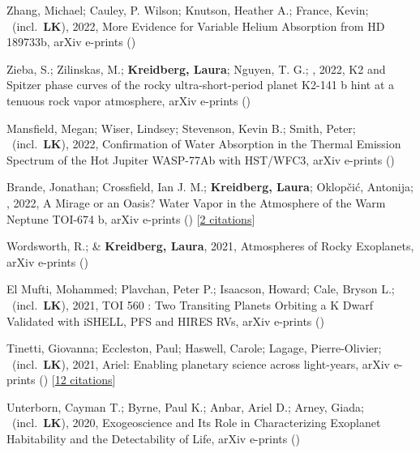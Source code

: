 \item[{\color{numcolor}\scriptsize19}] Zhang, Michael; Cauley, P. Wilson; Knutson, Heather A.; France, Kevin; \etal\ (incl.\ \textbf{LK}), 2022, More Evidence for Variable Helium Absorption from HD 189733b, arXiv e-prints ()

\item[{\color{numcolor}\scriptsize18}] Zieba, S.; Zilinskas, M.; \textbf{Kreidberg, Laura}; Nguyen, T. G.; \etal, 2022, K2 and Spitzer phase curves of the rocky ultra-short-period planet K2-141 b hint at a tenuous rock vapor atmosphere, arXiv e-prints ()

\item[{\color{numcolor}\scriptsize17}] Mansfield, Megan; Wiser, Lindsey; Stevenson, Kevin B.; Smith, Peter; \etal\ (incl.\ \textbf{LK}), 2022, Confirmation of Water Absorption in the Thermal Emission Spectrum of the Hot Jupiter WASP-77Ab with HST/WFC3, arXiv e-prints ()

\item[{\color{numcolor}\scriptsize16}] Brande, Jonathan; Crossfield, Ian J. M.; \textbf{Kreidberg, Laura}; Oklop{\v{c}}i{\'c}, Antonija; \etal, 2022, A Mirage or an Oasis? Water Vapor in the Atmosphere of the Warm Neptune TOI-674 b, arXiv e-prints () [\href{https://ui.adsabs.harvard.edu/abs/2022arXiv220104197B}{2 citations}]

\item[{\color{numcolor}\scriptsize15}] Wordsworth, R.; \& \textbf{Kreidberg, Laura}, 2021, Atmospheres of Rocky Exoplanets, arXiv e-prints ()

\item[{\color{numcolor}\scriptsize14}] El Mufti, Mohammed; Plavchan, Peter P.; Isaacson, Howard; Cale, Bryson L.; \etal\ (incl.\ \textbf{LK}), 2021, TOI 560 : Two Transiting Planets Orbiting a K Dwarf Validated with iSHELL, PFS and HIRES RVs, arXiv e-prints ()

\item[{\color{numcolor}\scriptsize13}] Tinetti, Giovanna; Eccleston, Paul; Haswell, Carole; Lagage, Pierre-Olivier; \etal\ (incl.\ \textbf{LK}), 2021, Ariel: Enabling planetary science across light-years, arXiv e-prints () [\href{https://ui.adsabs.harvard.edu/abs/2021arXiv210404824T}{12 citations}]

\item[{\color{numcolor}\scriptsize12}] Unterborn, Cayman T.; Byrne, Paul K.; Anbar, Ariel D.; Arney, Giada; \etal\ (incl.\ \textbf{LK}), 2020, Exogeoscience and Its Role in Characterizing Exoplanet Habitability and the Detectability of Life, arXiv e-prints ()


